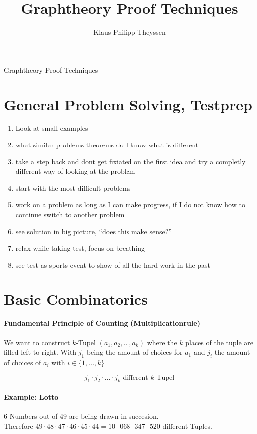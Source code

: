 \documentclass[a4paper]{article}
\title{Graphtheory Proof Techniques}
\author{Klaus Philipp Theyssen}
\begin{document}
\begin{center}
    \Large Graphtheory Proof Techniques
\end{center}


\section{General Problem Solving, Testprep}
\begin{enumerate}
    \item Look at small examples 
    \item what similar problems theorems do I know what is different
    \item take a step back and dont get fixiated on the first idea and try 
        a completly different way of looking at the problem
    \item start with the most difficult problems
    \item work on a problem as long as I can make progress, if I do not know
        how to continue switch to another problem
    \item see solution in big picture, \enquote{does this make sense?}
    \item relax while taking test, focus on breathing 
    \item see test as sports event to show of all the hard work in the past
\end{enumerate}

\section{Basic Combinatorics}
\paragraph{Fundamental Principle of Counting (Multiplicationrule)} $ $ \\
We want to construct $k$-Tupel $ (a_1,a_2,...,a_k) $ where the $ k $ places of the 
tuple are filled left to right. With $ j_1 $ being the amount of choices for $ a_1 $
and $ j_i $ the amount of choices of $ a_i $ with $ i \in \{1,...,k\} $

$$ j_1 \cdot j_2 \cdot ... \cdot j_k \text{ different } k\text{-Tupel} $$

\paragraph{Example: Lotto} $ $ \\  
6 Numbers out of 49 are being drawn in succesion. \\
Therefore $ 49 \cdot 48 \cdot 47 \cdot 46 \cdot 45 \cdot 44
 = 10\text{ }068 \text{ }347 \text{ }520 $ different Tuples.
\end{document}
